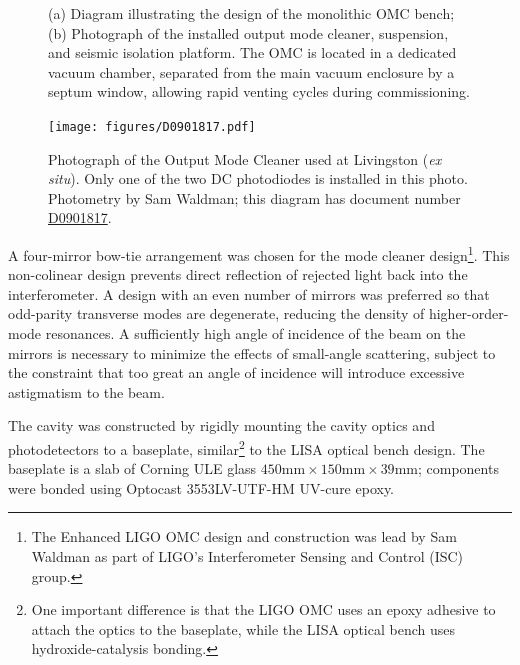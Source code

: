 \begin{figure}[t]
\caption[OMC diagram and photograph of installation]{
  (a) Diagram illustrating the design of the monolithic OMC
  bench; (b) Photograph of the installed output mode cleaner,
  suspension, and seismic isolation platform. The OMC is located in a
  dedicated vacuum chamber, separated from the main vacuum enclosure
  by a septum window, allowing rapid venting cycles during
  commissioning.}
\end{figure}
\begin{figure}
\texttt{[image: figures/D0901817.pdf]}
\caption[Output Mode Cleaner photograph]{Photograph of the Output Mode
  Cleaner used at Livingston (\emph{ex situ}).  Only one of the two DC
  photodiodes is installed in this photo.  Photometry by Sam Waldman;
  this diagram has document number
  \href{https://dcc.ligo.org/cgi-bin/private/DocDB/ShowDocument?docid=4713}{D0901817}.
}
\end{figure}


A four-mirror bow-tie arrangement was chosen for the mode cleaner
design\footnote{The Enhanced LIGO OMC design and construction was lead by
  Sam Waldman as part of LIGO's Interferometer Sensing and Control (ISC)
  group.}.  This non-colinear design prevents direct reflection of
rejected light back into the interferometer.  A design with an even
number of mirrors was preferred so that odd-parity transverse modes
are degenerate, reducing the density of higher-order-mode resonances.
A sufficiently high angle of incidence of the beam on the mirrors is
necessary to minimize the effects of small-angle scattering, subject
to the constraint that too great an angle of incidence will introduce
excessive astigmatism to the beam.

The cavity was constructed by rigidly mounting the cavity optics and
photodetectors to a baseplate, similar\footnote{One important
  difference is that the LIGO OMC uses an epoxy adhesive to attach the
  optics to the baseplate, while the LISA optical bench uses hydroxide-catalysis
  bonding\cite{Ressel2010Ultrastable,Elliffe2005Hydroxidecatalysis}.}
to the LISA optical bench design\cite{dArcio2010Optical}.
The baseplate is a slab of Corning ULE glass $450 \mathrm{mm}
\times 150 \mathrm{mm} \times \mathrm{39}\mathrm{mm}$; components were
bonded using Optocast {\sffamily 3553LV-UTF-HM} UV-cure epoxy.

